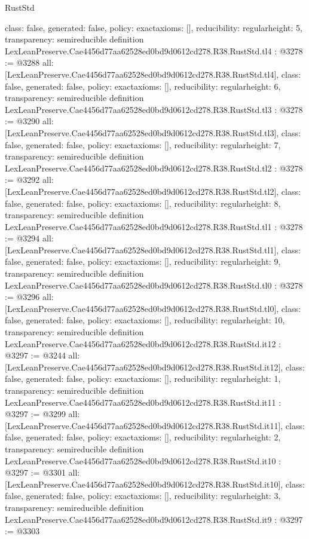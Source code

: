 \begin{lexlean}{RustStd}
\begin{coremodule}
{  class: false,
  generated: false,
  policy: exact{axioms: []},
  reducibility: regular{height: 5},
  transparency: semireducible
}
definition LexLeanPreserve.Cae4456d77aa62528ed0bd9d0612cd278.R38.RustStd.tl4 : @3278 := @3288 {
  all: [LexLeanPreserve.Cae4456d77aa62528ed0bd9d0612cd278.R38.RustStd.tl4],
  class: false,
  generated: false,
  policy: exact{axioms: []},
  reducibility: regular{height: 6},
  transparency: semireducible
}
definition LexLeanPreserve.Cae4456d77aa62528ed0bd9d0612cd278.R38.RustStd.tl3 : @3278 := @3290 {
  all: [LexLeanPreserve.Cae4456d77aa62528ed0bd9d0612cd278.R38.RustStd.tl3],
  class: false,
  generated: false,
  policy: exact{axioms: []},
  reducibility: regular{height: 7},
  transparency: semireducible
}
definition LexLeanPreserve.Cae4456d77aa62528ed0bd9d0612cd278.R38.RustStd.tl2 : @3278 := @3292 {
  all: [LexLeanPreserve.Cae4456d77aa62528ed0bd9d0612cd278.R38.RustStd.tl2],
  class: false,
  generated: false,
  policy: exact{axioms: []},
  reducibility: regular{height: 8},
  transparency: semireducible
}
definition LexLeanPreserve.Cae4456d77aa62528ed0bd9d0612cd278.R38.RustStd.tl1 : @3278 := @3294 {
  all: [LexLeanPreserve.Cae4456d77aa62528ed0bd9d0612cd278.R38.RustStd.tl1],
  class: false,
  generated: false,
  policy: exact{axioms: []},
  reducibility: regular{height: 9},
  transparency: semireducible
}
definition LexLeanPreserve.Cae4456d77aa62528ed0bd9d0612cd278.R38.RustStd.tl0 : @3278 := @3296 {
  all: [LexLeanPreserve.Cae4456d77aa62528ed0bd9d0612cd278.R38.RustStd.tl0],
  class: false,
  generated: false,
  policy: exact{axioms: []},
  reducibility: regular{height: 10},
  transparency: semireducible
}
definition LexLeanPreserve.Cae4456d77aa62528ed0bd9d0612cd278.R38.RustStd.it12 : @3297 := @3244 {
  all: [LexLeanPreserve.Cae4456d77aa62528ed0bd9d0612cd278.R38.RustStd.it12],
  class: false,
  generated: false,
  policy: exact{axioms: []},
  reducibility: regular{height: 1},
  transparency: semireducible
}
definition LexLeanPreserve.Cae4456d77aa62528ed0bd9d0612cd278.R38.RustStd.it11 : @3297 := @3299 {
  all: [LexLeanPreserve.Cae4456d77aa62528ed0bd9d0612cd278.R38.RustStd.it11],
  class: false,
  generated: false,
  policy: exact{axioms: []},
  reducibility: regular{height: 2},
  transparency: semireducible
}
definition LexLeanPreserve.Cae4456d77aa62528ed0bd9d0612cd278.R38.RustStd.it10 : @3297 := @3301 {
  all: [LexLeanPreserve.Cae4456d77aa62528ed0bd9d0612cd278.R38.RustStd.it10],
  class: false,
  generated: false,
  policy: exact{axioms: []},
  reducibility: regular{height: 3},
  transparency: semireducible
}
definition LexLeanPreserve.Cae4456d77aa62528ed0bd9d0612cd278.R38.RustStd.it9 : @3297 := @3303 {
}
\end{coremodule}
\end{lexlean}
